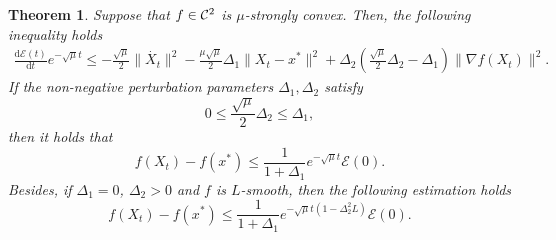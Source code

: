 \documentclass[11pt]{article}
\newcommand{\1}{\mathbf 1}
\numberwithin{equation}{section}
\newtheorem{THM}{Theorem}
\begin{document}
\begin{THM}
\label{theorem for general ODE}
Suppose that $f\in{\cal C}^2$ is $\mu$-strongly convex. 
Then, the following inequality holds
\begin{equation*}
    \begin{aligned}
        \label{the inequality of dE(t)/dt}
        \frac{\mathrm{d} \mathcal{E}(t)}{\mathrm{d} t}e^{-\sqrt{\mu}t}\leqslant -\frac{\sqrt{\mu}}{2}\|\dot{X_t}\|^2
        -\frac{\mu\sqrt{\mu}}{2}\Delta_1\|X_t-x^*\|^2+\Delta_2(\frac{\sqrt{\mu}}{2}\Delta_2-\Delta_1)\|\nabla f(X_t)\|^2.
    \end{aligned}
\end{equation*}
If the non-negative perturbation parameters $\Delta_1, \Delta_2$ satisfy
\begin{equation}
	\label{continuous condition}
	0 \leqslant \frac{\sqrt{\mu}}{2}\Delta_2\leqslant \Delta_1,
\end{equation}
then it holds that
\begin{equation}
        f(X_t)-f(x^*)\leqslant \frac{1}{1+\Delta_1}e^{-\sqrt{\mu}t}\mathcal{E}(0).
\end{equation}
Besides, if $\Delta_1=0$, $\Delta_2>0$ and $f$ is $L$-smooth, then the following estimation holds
\begin{equation}
    \label{eq: convergence rate of delta1 = 0, delta2 > 0 in continuous case}
    f(X_t)-f(x^*)\leqslant \frac{1}{1+\Delta_1}e^{-\sqrt{\mu}t(1-\Delta_2^2L)}\mathcal{E}(0).
\end{equation}
\end{THM}
\end{document}
